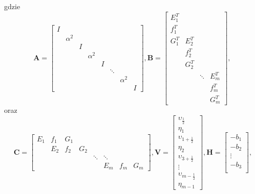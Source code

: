 \documentclass[12pt, twoside]{book}
\begin{document}
gdzie 
\begin{equation}
\textbf{A} = \begin{bmatrix}
I &  &  &  &  &  &  &  \\
& \alpha^2 &  &  &  &  &  &  \\
&  & I &  &  &  &  &  \\
&  &  & \alpha^2 &  &  &  &  \\
&  &  &  & I &  &  &  \\
&  &  &  &  & \ddots &  &  \\
&  &  &  &  &  & \alpha^2 &  \\
&  &  &  &  &  &  & I 
\end{bmatrix},
\textbf{B} = \begin{bmatrix}
E_1^T &  &  &  \\
f_1^T &  &  &  \\
G_1^T & E_2^T &  &  \\
& f_2^T &  &  \\
& G_2^T &  &  \\
&  & \ddots & E_m^T \\
&  &  & f_m^T \\
&  &  & G_m^T 
\end{bmatrix},\
\label{LSS_v11}
\end{equation}
oraz
\begin{equation}
\textbf{C} = \begin{bmatrix}
E_{1} & f_{1} & G_{1} &  &  &  &  &  \\
& E_{2} & f_{2} & G_{2} &  &  &  &  \\
&  &  &  & \ddots & \ddots &  &  \\
&  &  &  &  & E_{m} & f_{m} & G_{m} 
\end{bmatrix},	
\textbf{V} = \begin{bmatrix}
\upsilon_{\frac{1}{2}} \\
\eta_{1} \\
\upsilon_{1 + \frac{1}{2}} \\
\eta_{2} \\
\upsilon_{3 + \frac{1}{2}} \\
\vdots \\
\upsilon_{m - \frac{1}{2}} \\
\eta_{m-1} 
\end{bmatrix},
\textbf{H} = \begin{bmatrix}
-b_{1} \\
-b_{2} \\
\vdots \\
-b_{3}\\
\end{bmatrix},
\label{LSS_v12}
\end{equation}
\end{document}
